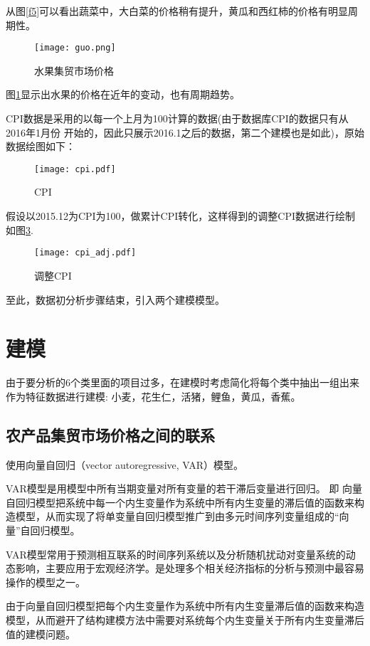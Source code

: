 \documentclass[a4paper,AutoFakeBold,AutoFakeSlant]{ctexart}
\begin{document}
从图\ref{f5}可以看出蔬菜中，大白菜的价格稍有提升，黄瓜和西红柿的价格有明显周期性。

\begin{figure}[H]
  \centering
  \texttt{[image: guo.png]}
  \caption{水果集贸市场价格}
  \label{f6}
\end{figure}

图\ref{f6}显示出水果的价格在近年的变动，也有周期趋势。

CPI数据是采用的以每一个上月为100计算的数据(由于数据库CPI的数据只有从2016年1月份
开始的，因此只展示2016.1之后的数据，第二个建模也是如此)，原始数据绘图如下：
\begin{figure}[htbp]
  \centering
  \texttt{[image: cpi.pdf]}
  \caption{CPI}
  \label{f7}
\end{figure}

假设以2015.12为CPI为100，做累计CPI转化，这样得到的调整CPI数据进行绘制如图\ref{f8}.
\begin{figure}[htbp]
  \centering
  \texttt{[image: cpi\_adj.pdf]}
  \caption{调整CPI}
  \label{f8}
\end{figure}

至此，数据初分析步骤结束，引入两个建模模型。


\section{建模}

由于要分析的6个类里面的项目过多，在建模时考虑简化将每个类中抽出一组出来作为特征数据进行建模: 
小麦，花生仁，活猪，鲤鱼，黄瓜，香蕉。


\subsection{农产品集贸市场价格之间的联系}
使用向量自回归（vector autoregressive, VAR）模型。\cite{tsay2005analysis}

VAR模型是用模型中所有当期变量对所有变量的若干滞后变量进行回归。
即
向量自回归模型把系统中每一个内生变量作为系统中所有内生变量的滞后值的函数来构造模型，从而实现了将单变量自回归模型推广到由多元时间序列变量组成的“向量”自回归模型。

VAR模型常用于预测相互联系的时间序列系统以及分析随机扰动对变量系统的动态影响，主要应用于宏观经济学。是处理多个相关经济指标的分析与预测中最容易操作的模型之一。

由于向量自回归模型把每个内生变量作为系统中所有内生变量滞后值的函数来构造模型，从而避开了结构建模方法中需要对系统每个内生变量关于所有内生变量滞后值的建模问题。
\end{document}
